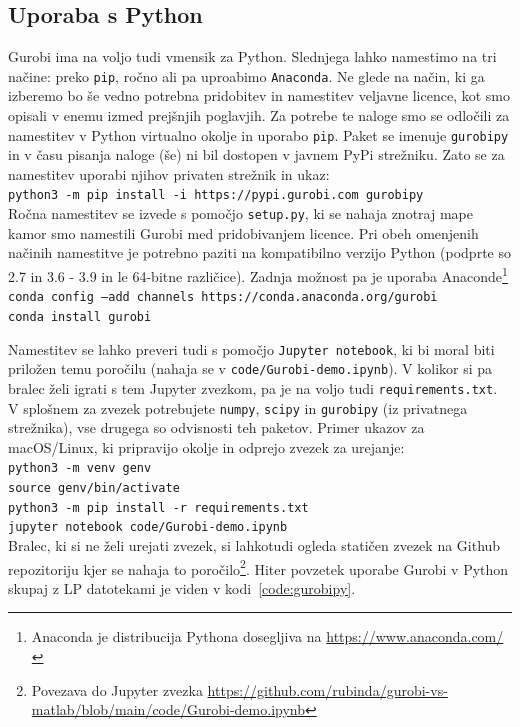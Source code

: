 \documentclass[a4paper,11pt]{article}
\begin{document}
\subsection{Uporaba s Python}
Gurobi ima na voljo tudi vmensik za Python. Slednjega lahko namestimo na tri načine: preko \texttt{pip}, ročno ali pa uproabimo \texttt{Anaconda}. Ne glede na način, ki ga izberemo bo še vedno potrebna pridobitev in namestitev veljavne licence, kot smo opisali v enemu izmed prejšnjih poglavjih. Za potrebe te naloge smo se odločili za namestitev v Python virtualno okolje in uporabo \texttt{pip}. Paket se imenuje \texttt{gurobipy} in v času pisanja naloge (še) ni bil dostopen v javnem PyPi strežniku. Zato se za namestitev uporabi njihov privaten strežnik in ukaz:  \\
\texttt{python3 -m pip install -i https://pypi.gurobi.com gurobipy} \\
Ročna namestitev se izvede s pomočjo \texttt{setup.py}, ki se nahaja znotraj mape kamor smo namestili Gurobi med pridobivanjem licence. Pri obeh omenjenih načinih namestitve je potrebno paziti na kompatibilno verzijo Python (podprte so 2.7 in 3.6 - 3.9 in le 64-bitne različice). Zadnja možnost pa je uporaba Anaconde\footnote{Anaconda je distribucija Pythona dosegljiva na \url{https://www.anaconda.com/}} \\
\texttt{conda config --add channels https://conda.anaconda.org/gurobi} \\
\texttt{conda install gurobi} 

Namestitev se lahko preveri tudi s pomočjo \texttt{Jupyter notebook}, ki bi moral biti priložen temu poročilu (nahaja se v  \texttt{code/Gurobi-demo.ipynb}). V kolikor si pa bralec želi igrati s tem Jupyter zvezkom, pa je na voljo tudi \texttt{requirements.txt}. V splošnem za zvezek potrebujete \texttt{numpy}, \texttt{scipy} in \texttt{gurobipy} (iz privatnega strežnika), vse drugega so odvisnosti teh paketov. Primer ukazov za macOS/Linux, ki pripravijo okolje in odprejo zvezek za urejanje: \\
\texttt{python3 -m venv genv} \\
\texttt{source genv/bin/activate} \\
\texttt{python3 -m pip install -r requirements.txt} \\
\texttt{jupyter notebook code/Gurobi-demo.ipynb} \\
Bralec, ki si ne želi urejati zvezek, si lahkotudi  ogleda statičen zvezek na Github repozitoriju kjer se nahaja to poročilo\footnote{Povezava do Jupyter zvezka \url{https://github.com/rubinda/gurobi-vs-matlab/blob/main/code/Gurobi-demo.ipynb}}. Hiter povzetek uporabe Gurobi v Python skupaj z LP datotekami je viden v kodi~\ref{code:gurobipy}.
\end{document}

